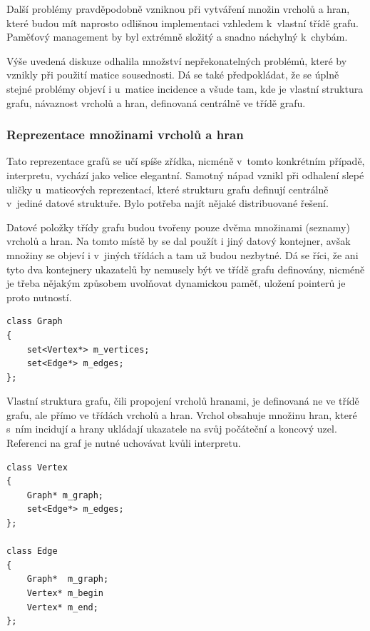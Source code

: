 \documentclass[11pt,twoside,a4paper]{book}
\begin{document}
Další problémy pravděpodobně vzniknou při vytváření množin vrcholů a hran, které budou mít naprosto odlišnou implementaci vzhledem k~vlastní třídě grafu. Paměťový management by byl extrémně složitý a snadno náchylný k~chybám.

Výše uvedená diskuze odhalila množství nepřekonatelných problémů, které by vznikly při použití matice sousednosti. Dá se také předpokládat, že se úplně stejné problémy objeví i u~matice incidence a všude tam, kde je vlastní struktura grafu, návaznost vrcholů a hran, definovaná centrálně ve třídě grafu.


\subsubsection{Reprezentace množinami vrcholů a hran}
\label{reprezentace_mnozinami_vrcholu_a_hran}

Tato reprezentace grafů se učí spíše zřídka, nicméně v~tomto konkrétním případě, interpretu, vychází jako velice elegantní. Samotný nápad vznikl při odhalení slepé uličky u~maticových reprezentací, které strukturu grafu definují centrálně v~jediné datové struktuře. Bylo potřeba najít nějaké distribuované řešení.

Datové položky třídy grafu budou tvořeny pouze dvěma množinami (seznamy) vrcholů a hran. Na tomto místě by se dal použít i jiný datový kontejner, avšak množiny se objeví i v~jiných třídách a tam už budou nezbytné. Dá se říci, že ani tyto dva kontejnery ukazatelů by nemusely být ve třídě grafu definovány, nicméně je třeba nějakým způsobem uvolňovat dynamickou paměť, uložení pointerů je proto nutností.

\begin{verbatim}
class Graph
{
    set<Vertex*> m_vertices;
    set<Edge*> m_edges;
};
\end{verbatim}

Vlastní struktura grafu, čili propojení vrcholů hranami, je definovaná ne ve třídě grafu, ale přímo ve třídách vrcholů a hran. Vrchol obsahuje množinu hran, které s~ním incidují a hrany ukládají ukazatele na svůj počáteční a koncový uzel. Referenci na graf je nutné uchovávat kvůli interpretu.

\begin{verbatim}
class Vertex
{
    Graph* m_graph;
    set<Edge*> m_edges;
};

class Edge
{
    Graph*  m_graph;
    Vertex* m_begin
    Vertex* m_end;
};
\end{verbatim}
\end{document}
